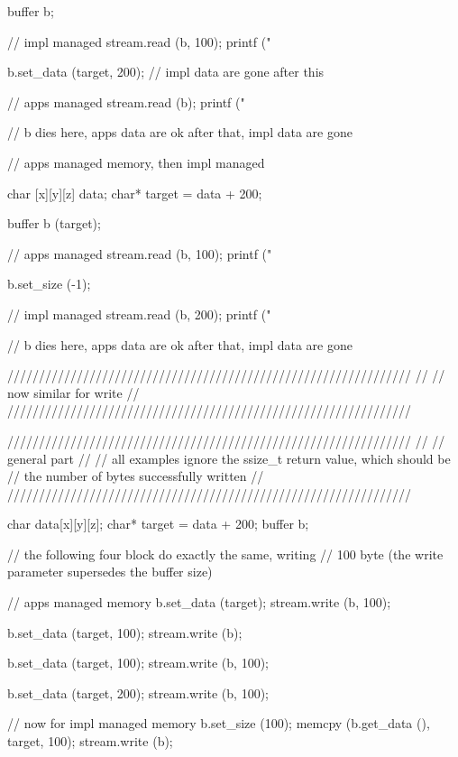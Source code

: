 \begin{mycode}
{{      buffer b;
  
      // impl managed
      stream.read (b, 100);
      printf ("%
  
      b.set_data (target, 200); // impl data are gone after this
  
      // apps managed
      stream.read (b);
      printf ("%
  
    } // b dies here, apps data are ok after that, impl data are gone
  }
  
  
  // apps managed memory, then impl managed
  {
    {
      char [x][y][z] data;
      char* target = data + 200;
  
      buffer b (target);
  
      // apps managed
      stream.read (b, 100);
      printf ("%
  
      b.set_size (-1);
  
      // impl managed
      stream.read (b, 200);
      printf ("%
  
    } // b dies here, apps data are ok after that, impl data are gone
  }
  
  
  ////////////////////////////////////////////////////////////////
  //
  // now similar for write
  //
  ////////////////////////////////////////////////////////////////
  
  ////////////////////////////////////////////////////////////////
  //
  // general part
  //
  // all examples ignore the ssize_t return value, which should be
  // the number of bytes successfully written
  //
  ////////////////////////////////////////////////////////////////
  {
    char data[x][y][z];
    char* target = data + 200;
    buffer b;
    
    // the following four block do exactly the same, writing 
    // 100 byte (the write parameter supersedes the buffer size)
  
    // apps managed memory
    {
      b.set_data (target);
      stream.write (b, 100);
    }
  
    {
      b.set_data (target, 100);
      stream.write (b);
    }
  
    {
      b.set_data (target, 100);
      stream.write (b, 100);
    }
  
    {
      b.set_data (target, 200);
      stream.write (b, 100);
    }
  
  
    // now for impl managed memory
    {
      b.set_size (100);
      memcpy (b.get_data (), target, 100);
      stream.write (b);
    }
  
}
\end{mycode}
